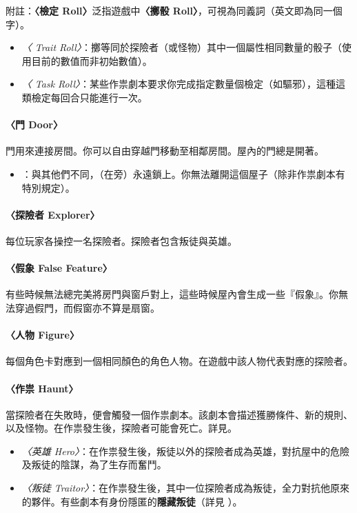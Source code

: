 附註：\textbf{〈檢定 Roll〉}泛指遊戲中\textbf{〈擲骰 Roll〉}，可視為同義詞（英文即為同一個字）。

\begin{itemize}
  \item \textit{〈 Trait Roll〉}：擲等同於探險者（或怪物）其中一個屬性相同數量的骰子（使用目前的數值而非初始數值）。
  \item \textit{〈 Task Roll〉}：某些作祟劇本要求你完成指定數量個檢定（如驅邪），這種這類檢定每回合只能進行一次。
\end{itemize}

\paragraph{〈門 Door〉}
門用來連接房間。你可以自由穿越門移動至相鄰房間。屋內的門總是開著。

\begin{itemize}
  \item \textit{}：與其他們不同，（在旁）永遠鎖上。你無法離開這個屋子（除非作祟劇本有特別規定）。
\end{itemize}

\paragraph{〈探險者 Explorer〉}
每位玩家各操控一名探險者。探險者包含叛徒與英雄。

\paragraph{〈假象 False Feature〉}
有些時候無法總完美將房門與窗戶對上，這些時候屋內會生成一些『假象』。你無法穿過假門，而假窗亦不算是扇窗。

\paragraph{〈人物 Figure〉}
每個角色卡對應到一個相同顏色的角色人物。在遊戲中該人物代表對應的探險者。

\paragraph{〈作祟 Haunt〉}
當探險者在失敗時，便會觸發一個作祟劇本。該劇本會描述獲勝條件、新的規則、以及怪物。在作祟發生後，探險者可能會死亡。詳見。

\begin{itemize}
  \item \textit{〈英雄 Hero〉}：在作祟發生後，叛徒以外的探險者成為英雄，對抗屋中的危險及叛徒的陰謀，為了生存而奮鬥。
  \item \textit{〈叛徒 Traitor〉}：在作祟發生後，其中一位探險者成為叛徒，全力對抗他原來的夥伴。有些劇本有身份隱匿的\textbf{隱藏叛徒}（詳見 ）。
\end{itemize}

